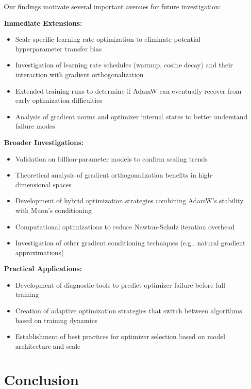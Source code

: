\documentclass[11pt,a4paper]{article}
\begin{document}
Our findings motivate several important avenues for future investigation:

\textbf{Immediate Extensions:}
\begin{itemize}[leftmargin=*]
    \item Scale-specific learning rate optimization to eliminate potential hyperparameter transfer bias
    \item Investigation of learning rate schedules (warmup, cosine decay) and their interaction with gradient orthogonalization
    \item Extended training runs to determine if AdamW can eventually recover from early optimization difficulties
    \item Analysis of gradient norms and optimizer internal states to better understand failure modes
\end{itemize}

\textbf{Broader Investigations:}
\begin{itemize}[leftmargin=*]
    \item Validation on billion-parameter models to confirm scaling trends
    \item Theoretical analysis of gradient orthogonalization benefits in high-dimensional spaces
    \item Development of hybrid optimization strategies combining AdamW's stability with Muon's conditioning
    \item Computational optimizations to reduce Newton-Schulz iteration overhead
    \item Investigation of other gradient conditioning techniques (e.g., natural gradient approximations)
\end{itemize}

\textbf{Practical Applications:}
\begin{itemize}[leftmargin=*]
    \item Development of diagnostic tools to predict optimizer failure before full training
    \item Creation of adaptive optimization strategies that switch between algorithms based on training dynamics
    \item Establishment of best practices for optimizer selection based on model architecture and scale
\end{itemize}

\section{Conclusion}
\end{document}
